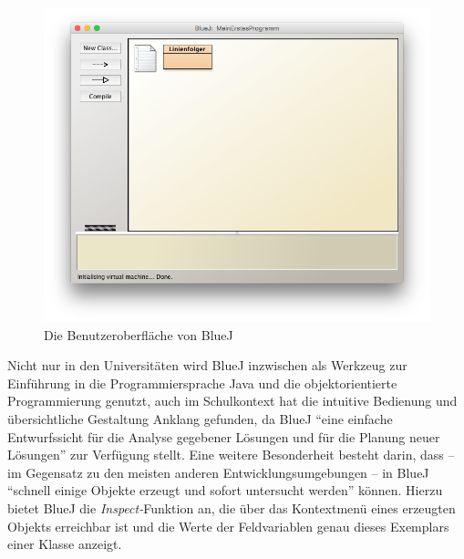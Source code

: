 \documentclass[paper=a4, DIV=calc, BCOR=12mm, twoside=on, onecolumn=on, open = right, titlepage =on, parskip =half-, headsepline = on, footsepline = off, chapterprefix = off, appendixprefix = on, fontsize = 12pt, numbers = noenddot, abstract = on]{scrbook}
\begin{document}
\begin{figure}[htb]
\centering
\includegraphics[width=\textwidth]{images/firstprogram.png}
\caption{Die Benutzeroberfläche von BlueJ}
\label{fig:BlueJ UI}
\end{figure}

Nicht nur in den Universitäten wird BlueJ inzwischen als Werkzeug zur Einführung in die Programmiersprache Java und die objektorientierte Programmierung genutzt, auch im Schulkontext hat die intuitive Bedienung und übersichtliche Gestaltung Anklang gefunden, da BlueJ "`eine einfache Entwurfssicht für die Analyse gegebener Lösungen und für die Planung neuer Lösungen"' \cite[S.6]{ehmann:09} zur Verfügung stellt. Eine weitere Besonderheit besteht darin, dass -- im Gegensatz zu den meisten anderen Entwicklungsumgebungen -- in BlueJ "`schnell einige Objekte erzeugt und sofort untersucht werden"' \cite[S.6]{ehmann:09} können. Hierzu bietet BlueJ die \emph{Inspect-}Funktion an, die über das Kontextmenü eines erzeugten Objekts erreichbar ist und die Werte der Feldvariablen genau dieses Exemplars einer Klasse anzeigt.
\end{document}
